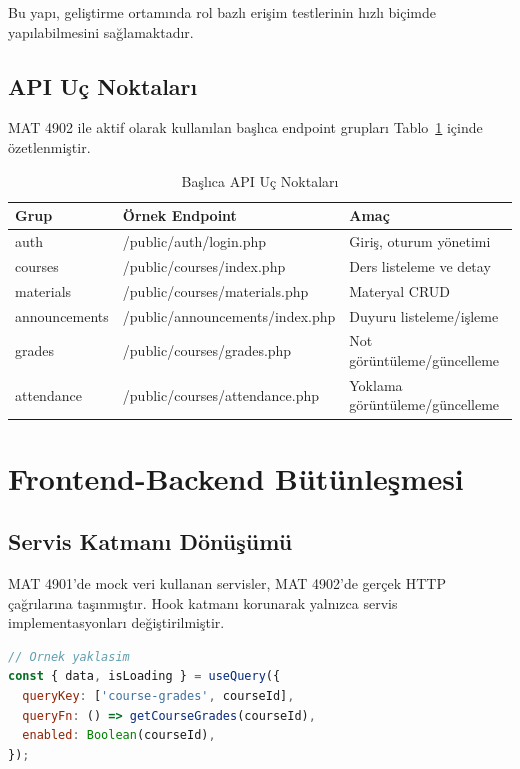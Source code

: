 \documentclass[12pt,a4paper]{article}
\begin{document}
Bu yapı, geliştirme ortamında rol bazlı erişim testlerinin hızlı biçimde yapılabilmesini sağlamaktadır.

\subsection{API Uç Noktaları}
MAT 4902 ile aktif olarak kullanılan başlıca endpoint grupları Tablo~\ref{tab:api} içinde özetlenmiştir.

\begin{table}[H]
\centering
\caption{Başlıca API Uç Noktaları}
\label{tab:api}
\begin{tabular}{@{}lll@{}}
\toprule
\textbf{Grup} & \textbf{Örnek Endpoint} & \textbf{Amaç} \\
\midrule
auth & /public/auth/login.php & Giriş, oturum yönetimi \\
courses & /public/courses/index.php & Ders listeleme ve detay \\
materials & /public/courses/materials.php & Materyal CRUD \\
announcements & /public/announcements/index.php & Duyuru listeleme/işleme \\
grades & /public/courses/grades.php & Not görüntüleme/güncelleme \\
attendance & /public/courses/attendance.php & Yoklama görüntüleme/güncelleme \\
\bottomrule
\end{tabular}
\end{table}

\section{Frontend-Backend Bütünleşmesi}

\subsection{Servis Katmanı Dönüşümü}
MAT 4901'de mock veri kullanan servisler, MAT 4902'de gerçek HTTP çağrılarına taşınmıştır. Hook katmanı korunarak yalnızca servis implementasyonları değiştirilmiştir.

\begin{lstlisting}[language=JavaScript, basicstyle=\ttfamily\small]
// Ornek yaklasim
const { data, isLoading } = useQuery({
  queryKey: ['course-grades', courseId],
  queryFn: () => getCourseGrades(courseId),
  enabled: Boolean(courseId),
});
\end{lstlisting}
\end{document}
